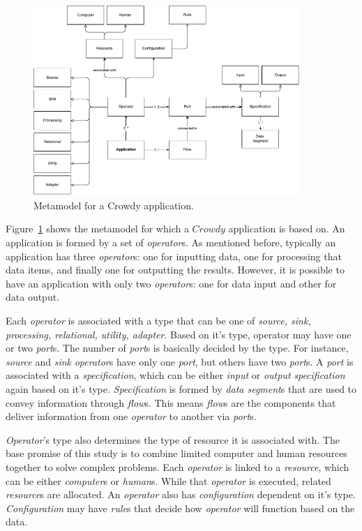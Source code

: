 \begin{figure}[ht]
	\centering
	\includegraphics[width=0.9\textwidth]{figures/ApplicationMetamodel.pdf}
	\caption{Metamodel for a Crowdy application.}
	\label{fig:metamodel}
\end{figure}

Figure~\ref{fig:metamodel} shows the metamodel for which a $Crowdy$ application is 
based on. An application is formed by a set of \textit{operator}s. As mentioned before, 
typically an application has three \textit{operator}s: one for inputting data, one for processing 
that data items, and finally one for outputting the results. However, it is possible to 
have an application with only two \textit{operator}s: one for data input and other for data 
output.

Each \textit{operator} is associated with a type that can be one of \textit{source, sink, 
processing, relational, utility, adapter}. Based on it's type, operator may have 
one or two \textit{port}s. The number of \textit{port}s is basically decided by the type. 
For instance, \textit{source} and \textit{sink} \textit{operator}s have only one \textit{port}, 
but others have two \textit{port}s. A \textit{port} is associated with a \textit{specification}, 
which can be either \textit{input} or \textit{output} \textit{specification} again based on 
it's type. \textit{Specification} is formed by \textit{data segment}s that are used to 
convey information through \textit{flow}s. This means \textit{flow}s are the 
components that deliver information from one \textit{operator} to another via \textit{port}s.

\textit{Operator}'s type also determines the type of resource it is associated with. The base 
promise of this study is to combine limited computer and human resources together to 
solve complex problems. Each \textit{operator} is linked to a \textit{resource}, which can be either 
\textit{computer}s or \textit{human}s. While that \textit{operator} is executed, related \textit{resource}s are 
allocated. An \textit{operator} also has \textit{configuration} dependent on it's type. \textit{Configuration} 
may have \textit{rule}s that decide how \textit{operator} will function based on the data.

